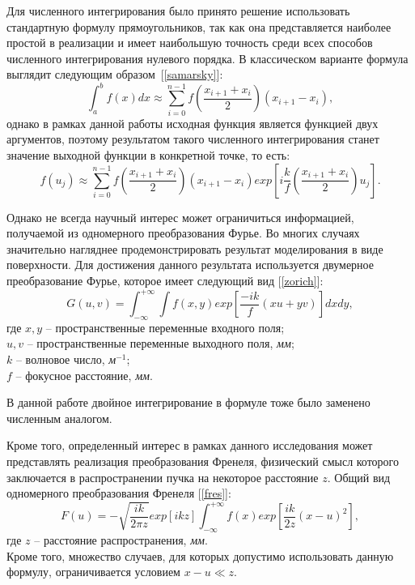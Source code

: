 {    Для численного интегрирования было принято решение использовать стандартную формулу
    прямоугольников, так как она представляется наиболее простой в реализации и
    имеет наибольшую точность среди всех способов численного интегрирования
    нулевого порядка. В классическом варианте формула выглядит следующим
    образом~[\ref{samarsky}]:
    \begin{equation}
        \label{integration}
        \int_a^b{f(x)dx} \approx \sum_{i=0}^{n-1} f(\frac{x_{i+1} + x_i}{2})(x_{i+1} - x_i),
    \end{equation}
    однако в рамках данной работы исходная функция является функцией двух аргументов,
    поэтому результатом такого численного интегрирования станет значение
    выходной функции в конкретной точке, то есть:
    \begin{equation*}
        \label{7}
        f(u_j) \approx \sum_{i=0}^{n-1}f(\frac{x_{i+1}+x_i}{2})(x_{i+1} - x_i) exp[i \frac{k}{f}(\frac{x_{i+1}+x_i}{2})u_j].
    \end{equation*}

    Однако не всегда научный интерес может ограничиться информацией, получаемой из одномерного преобразования Фурье.
    Во многих случаях значительно нагляднее продемонстрировать результат моделирования в виде поверхности.
    Для достижения данного результата используется двумерное преобразование Фурье, которое имеет следующий вид [\ref{zorich}]:
    \begin{equation}
        \label{2d_four}
        G(u, v) = \int_{-\infty}^{+\infty} \int f(x, y)exp[\frac{-ik}{f}(xu+yv)] dxdy,
    \end{equation}
    \tab    где $x, y$ -- пространственные переменные входного поля;  \\
    \tab \tab \hspace{-0.4cm}$u, v$ -- пространственные переменные выходного поля,  \textit{мм};\\
     \tab \tab \hspace{-0.4cm} $k$ -- волновое число, \textit{м}$^{-1}$;\\
    \tab \tab \hspace{-0.4cm} $f$ -- фокусное расстояние, \textit{мм}.

    В данной работе двойное интегрирование в формуле тоже было заменено численным аналогом.

    Кроме того, определенный интерес в рамках данного исследования может представлять реализация преобразования Френеля,
    физический смысл которого заключается в распространении пучка на некоторое расстояние $z$. Общий вид одномерного преобразования Френеля [\ref{fres}]:
    \begin{equation}
        \label{fresnel}
        F(u) = - \sqrt{\frac{ik}{2 \pi z}}exp[{ikz}]\int_{-\infty}^{+\infty}f(x) exp[{\frac{ik}{2z}(x - u)^2}],
    \end{equation}
    \tab где $z$ -- расстояние распространения,  \textit{мм}.\\
    Кроме того, множество случаев, для которых допустимо использовать данную формулу, ограничивается условием $x-u\ll z$.

}
